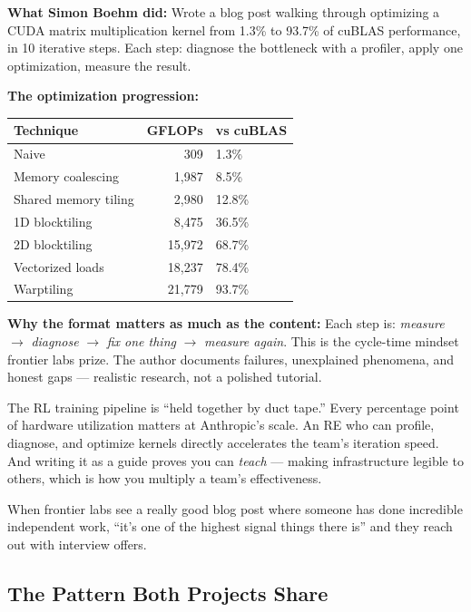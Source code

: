\textbf{What Simon Boehm did:} Wrote a blog post walking through optimizing a CUDA matrix multiplication kernel from 1.3\% to 93.7\% of cuBLAS performance, in 10 iterative steps. Each step: diagnose the bottleneck with a profiler, apply one optimization, measure the result.

\textbf{The optimization progression:}

\begin{tabular}{@{}lrl@{}}
\toprule
\textbf{Technique} & \textbf{GFLOPs} & \textbf{vs cuBLAS} \\
\midrule
Naive & 309 & 1.3\% \\
Memory coalescing & 1,987 & 8.5\% \\
Shared memory tiling & 2,980 & 12.8\% \\
1D blocktiling & 8,475 & 36.5\% \\
2D blocktiling & 15,972 & 68.7\% \\
Vectorized loads & 18,237 & 78.4\% \\
Warptiling & 21,779 & 93.7\% \\
\bottomrule
\end{tabular}

\textbf{Why the format matters as much as the content:} Each step is: \textit{measure} $\to$ \textit{diagnose} $\to$ \textit{fix one thing} $\to$ \textit{measure again}. This is the cycle-time mindset frontier labs prize. The author documents failures, unexplained phenomena, and honest gaps --- realistic research, not a polished tutorial.

\begin{whyanthro}
The RL training pipeline is ``held together by duct tape.'' Every percentage point of hardware utilization matters at Anthropic's scale. An RE who can profile, diagnose, and optimize kernels directly accelerates the team's iteration speed. And writing it as a guide proves you can \textit{teach} --- making infrastructure legible to others, which is how you multiply a team's effectiveness.

When frontier labs see a really good blog post where someone has done incredible independent work, ``it's one of the highest signal things there is'' and they reach out with interview offers.
\end{whyanthro}

\subsection{The Pattern Both Projects Share}

